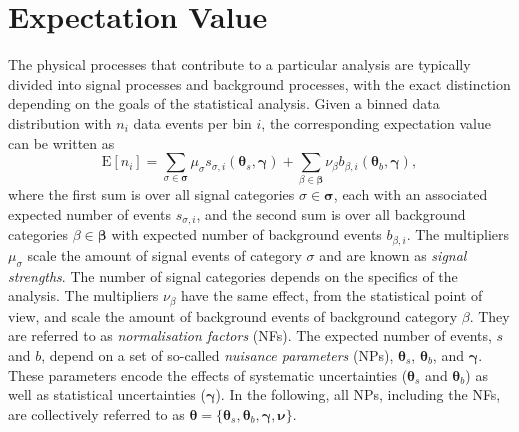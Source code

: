 \section{Expectation Value}
\label{sec:exp-value}
The physical processes that contribute to a particular analysis are typically divided into signal processes and background processes, with the exact distinction depending on the goals of the statistical analysis.
Given a binned data distribution with $n_i$ data events per bin $i$, the corresponding expectation value can be written as
\begin{equation}
    \text{E}[n_i] = \sum_{\sigma \in \pmb{\sigma}} \mu_\sigma s_{\sigma,i}(\pmb{\theta}_s, \pmb{\gamma}) + \sum_{\beta \in \pmb{\beta}} \nu_\beta b_{\beta,i}(\pmb{\theta}_b, \pmb{\gamma}),
\end{equation}
where the first sum is over all signal categories $\sigma \in \pmb{\sigma}$, each with an associated expected number of events $s_{\sigma, i}$, and the second sum is over all background categories $\beta \in \pmb{\beta}$ with expected number of background events $b_{\beta,i}$. 
The multipliers $\mu_\sigma$ scale the amount of signal events of category $\sigma$ and are known as \emph{signal strengths}. 
The number of signal categories depends on the specifics of the analysis. The multipliers $\nu_\beta$ have the same effect, from the statistical point of view, and scale the amount of background events of background category $\beta$. They are referred to as \emph{normalisation factors} (NFs). 
The expected number of events, $s$ and $b$, depend on a set of so-called \emph{nuisance parameters} (NPs), $\pmb{\theta}_s$, $\pmb{\theta}_b$, and $\pmb{\gamma}$. These parameters encode the effects of systematic uncertainties ($\pmb{\theta}_s$ and $\pmb{\theta}_b$) as well as statistical uncertainties ($\pmb{\gamma}$). In the following, all NPs, including the NFs, are collectively referred to as $\pmb{\theta} = \{\pmb{\theta}_s, \pmb{\theta}_b, \pmb{\gamma}, \pmb{\nu}\}$. 

